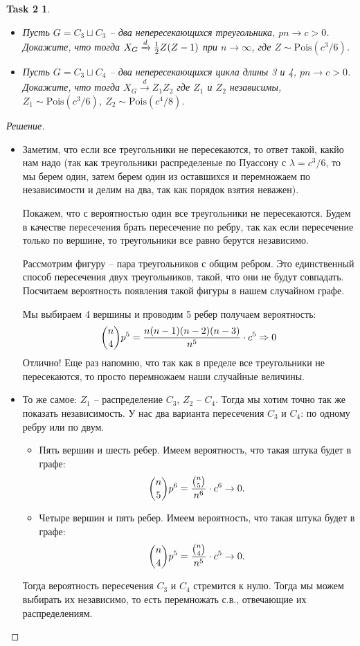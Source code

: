 \documentclass[12pt,a4paper]{extarticle}
\newtheorem*{task2}{Task 2}
\newcommand{\pd}{\xrightarrow{d}}
\newcommand{\ra}{\rightarrow}
\newcommand{\Pois}{\mathrm{Pois}}
\begin{document}
	\begin{task2}
		\
		\begin{itemize}
			\item[а)] Пусть $G = C_3 \sqcup C_3$ -- два непересекающихся треугольника, $pn \ra c > 0$. Докажите, что тогда $X_G \pd {1\over 2} Z(Z - 1)$ при $n \ra \infty$, где $Z \sim \Pois(c^3/6)$.
			
			\item[b)] Пусть $G = C_3 \sqcup C_4$ -- два непересекающихся цикла длины 3 и 4, $pn \ra c > 0$. Докажите, что тогда $X_G \pd Z_1Z_2$ где $Z_1$ и $Z_2$ независимы,  $Z_1 \sim \Pois(c^3/6)$, $Z_2 \sim \Pois(c^4/8)$.
		\end{itemize}
	\end{task2}
	\begin{proof}[Решение]
		\
		\begin{itemize}
			\item[a)] Заметим, что если все треугольники не пересекаются, то ответ такой, какйо нам надо (так как треугольники распределеные по Пуассону с $\lambda = c^3 / 6$, то мы берем один, затем берем один из оставшихся и перемножаем по независимости и делим на два, так как порядок взятия неважен). 
			
			Покажем, что с вероятностью один все треугольники не пересекаются. Будем в качестве пересечения брать пересечение по ребру, так как если пересечение только по вершине, то треугольники все равно берутся независимо. 
			
			Рассмотрим фигуру -- пара треугольников с общим ребром. Это единственный способ пересечения двух треугольников, такой, что они не будут совпадать. Посчитаем вероятность появления такой фигуры в нашем случайном графе.
			
			Мы выбираем 4 вершины и проводим 5 ребер получаем вероятность:
			\[
				\binom{n}{4} p^5 = {n(n-1)(n-2)(n-3) \over n^5}\cdot c^5 \Rightarrow 0
			\]
			Отлично! Еще раз напомню, что так как в пределе все треугольники не пересекаются, то просто перемножаем наши случайные величины. 
			
			\item[b)] То же самое: 
			$Z_1$ -- распределение $C_3$, $Z_2$ -- $C_4$. Тогда мы хотим точно так же показать независимость. У нас два варианта пересечения $C_3$ и $C_4$: по одному ребру или по двум.
			\begin{itemize}
				\item[По одному:] Пять вершин и шесть ребер. Имеем вероятность, что такая штука будет в графе:
				\[
					\binom{n}{5} p^6 = {\binom{n}{5} \over n^6}\cdot c^6 \ra 0.
				\]
				\item[По двум:] Четыре вершин и пять ребер. Имеем вероятность, что такая штука будет в графе:
				\[
					\binom{n}{4} p^5 = {\binom{n}{4} \over n^5}\cdot c^5 \ra 0.
				\]
			\end{itemize}
			Тогда вероятность пересечения $C_3$ и $C_4$ стремится к нулю. Тогда мы можем выбирать их независимо, то есть перемножать с.в., отвечающие их распределениям. 
		\end{itemize}
	\end{proof}
	
\end{document}
